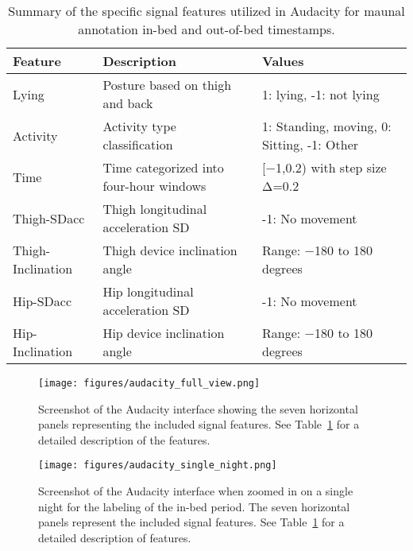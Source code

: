 \documentclass[
  10pt,
]{scrbook}
\begin{document}
\pagebreak

\begingroup

\footnotesize

\hypertarget{tbl-man_signal_features}{}
\begin{longtable}{lll}
\caption{\label{tbl-man_signal_features}Summary of the specific signal features utilized in Audacity for maunal
annotation in-bed and out-of-bed timestamps. }\tabularnewline

\toprule
Feature & Description & Values \\ 
\midrule
Lying & Posture based on thigh and back & 1: lying, -1: not lying \\ 
Activity & Activity type classification & 1: Standing, moving, 0: Sitting, -1: Other \\ 
Time & Time categorized into four-hour windows & [−1,0.2) with step size Δ=0.2 \\ 
Thigh-SDacc & Thigh longitudinal acceleration SD & -1: No movement \\ 
Thigh-Inclination & Thigh device inclination angle & Range: −180 to 180 degrees \\ 
Hip-SDacc & Hip longitudinal acceleration SD & -1: No movement \\ 
Hip-Inclination & Hip device inclination angle & Range: −180 to 180 degrees \\ 
\bottomrule
\end{longtable}

\endgroup

\begin{figure}

{\centering \texttt{[image: figures/audacity\_full\_view.png]}

}

\caption{\label{fig-screen_full}Screenshot of the Audacity interface
showing the seven horizontal panels representing the included signal
features. See Table~\ref{tbl-man_signal_features} for a detailed
description of the features.}

\end{figure}

\begin{figure}

{\centering \texttt{[image: figures/audacity\_single\_night.png]}

}

\caption{\label{fig-screen_night}Screenshot of the Audacity interface
when zoomed in on a single night for the labeling of the in-bed period.
The seven horizontal panels represent the included signal features. See
Table~\ref{tbl-man_signal_features} for a detailed description of
features.}

\end{figure}
\end{document}
